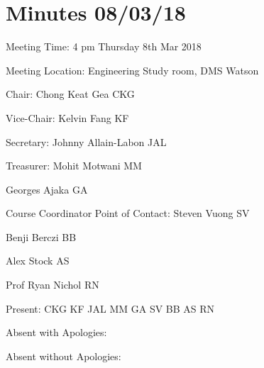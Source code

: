 \noindent 
\section{Minutes 08/03/18}\label{app:8-3}

\noindent Meeting Time: 4 pm Thursday 8th Mar 2018

\noindent Meeting Location: Engineering Study room, DMS Watson


\noindent \textbf{}

\noindent Chair: Chong Keat Gea CKG

\noindent Vice-Chair: Kelvin Fang KF

\noindent Secretary: Johnny Allain-Labon JAL

\noindent Treasurer: Mohit Motwani MM

\noindent Georges Ajaka GA

\noindent Course Coordinator Point of Contact: Steven Vuong SV

\noindent Benji Berczi BB

\noindent Alex Stock AS

\noindent Prof Ryan Nichol RN

\noindent 

\noindent Present: CKG KF JAL MM GA SV BB AS RN

\noindent Absent with Apologies: 

\noindent Absent without Apologies: 



